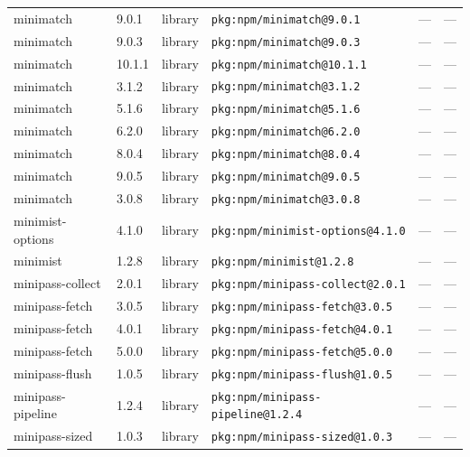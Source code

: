 \documentclass[11pt,a4paper]{article}
\begin{document}
\begin{longtable}{|p{4cm}|p{2cm}|p{1.6cm}|p{5cm}|p{1.5cm}|p{3.5cm}|}
\raggedright minimatch & 9.0.1 & library & \small\texttt{pkg:npm/minimatch@9.0.1} & — & \small — \\
\raggedright minimatch & 9.0.3 & library & \small\texttt{pkg:npm/minimatch@9.0.3} & — & \small — \\
\raggedright minimatch & 10.1.1 & library & \small\texttt{pkg:npm/minimatch@10.1.1} & — & \small — \\
\raggedright minimatch & 3.1.2 & library & \small\texttt{pkg:npm/minimatch@3.1.2} & — & \small — \\
\raggedright minimatch & 5.1.6 & library & \small\texttt{pkg:npm/minimatch@5.1.6} & — & \small — \\
\raggedright minimatch & 6.2.0 & library & \small\texttt{pkg:npm/minimatch@6.2.0} & — & \small — \\
\raggedright minimatch & 8.0.4 & library & \small\texttt{pkg:npm/minimatch@8.0.4} & — & \small — \\
\raggedright minimatch & 9.0.5 & library & \small\texttt{pkg:npm/minimatch@9.0.5} & — & \small — \\
\raggedright minimatch & 3.0.8 & library & \small\texttt{pkg:npm/minimatch@3.0.8} & — & \small — \\
\raggedright minimist-options & 4.1.0 & library & \small\texttt{pkg:npm/minimist-options@4.1.0} & — & \small — \\
\raggedright minimist & 1.2.8 & library & \small\texttt{pkg:npm/minimist@1.2.8} & — & \small — \\
\raggedright minipass-collect & 2.0.1 & library & \small\texttt{pkg:npm/minipass-collect@2.0.1} & — & \small — \\
\raggedright minipass-fetch & 3.0.5 & library & \small\texttt{pkg:npm/minipass-fetch@3.0.5} & — & \small — \\
\raggedright minipass-fetch & 4.0.1 & library & \small\texttt{pkg:npm/minipass-fetch@4.0.1} & — & \small — \\
\raggedright minipass-fetch & 5.0.0 & library & \small\texttt{pkg:npm/minipass-fetch@5.0.0} & — & \small — \\
\raggedright minipass-flush & 1.0.5 & library & \small\texttt{pkg:npm/minipass-flush@1.0.5} & — & \small — \\
\raggedright minipass-pipeline & 1.2.4 & library & \small\texttt{pkg:npm/minipass-pipeline@1.2.4} & — & \small — \\
\raggedright minipass-sized & 1.0.3 & library & \small\texttt{pkg:npm/minipass-sized@1.0.3} & — & \small — \\

\end{longtable}
\end{document}

